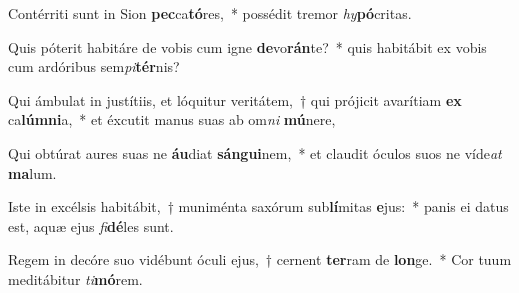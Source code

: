 \item Contérriti sunt in Sion \textbf{pec}ca\textbf{tó}res,~* possédit tremor \textit{hy}\textbf{pó}critas.
\item Quis póterit habitáre de vobis cum igne \textbf{de}vo\textbf{rán}te?~* quis habitábit ex vobis cum ardóribus sem\textit{pi}\textbf{tér}nis?
\item Qui ámbulat in justítiis, et lóquitur veritátem,~† qui prójicit avarítiam \textbf{ex} ca\textbf{lúm}\textbf{ni}a,~* et éxcutit manus suas ab om\textit{ni} \textbf{mú}nere,
\item Qui obtúrat aures suas ne \textbf{áu}diat \textbf{sán}\textbf{gui}nem,~* et claudit óculos suos ne víde\textit{at} \textbf{ma}lum.
\item Iste in excélsis habitábit,~† muniménta saxórum sub\textbf{lí}mitas \textbf{e}jus:~* panis ei datus est, aquæ ejus \textit{fi}\textbf{dé}les sunt.
\item Regem in decóre suo vidébunt óculi ejus,~† cernent \textbf{ter}ram de \textbf{lon}ge.~* Cor tuum meditábitur \textit{ti}\textbf{mó}rem.
